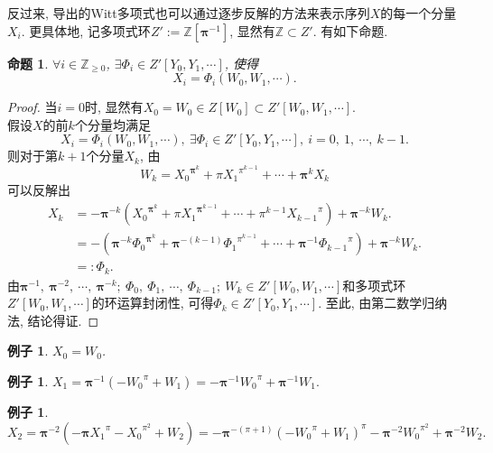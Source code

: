 \documentclass[UTF8, twoside]{ctexart}
\theoremstyle{nonumberplain}
\newtheorem{proof}{\heiti 证明}  %
\theoremstyle{nonumberplain}
\theoremstyle{plain}
\newtheorem{mingti}[dingyi]{命题}
\newtheorem{lizi}[dingyi]{例子}
\begin{document}
	反过来, 导出的Witt多项式也可以通过逐步反解的方法来表示序列$X$的每一个分量${{X}_{i}}$. 更具体地, 
	记多项式环$Z':=\mathbb{Z}\left[ {\bm{\pi}^{-1}} \right]$, 
	显然有$\mathbb{Z}\subset Z'$. 
	有如下命题.
	\begin{mingti} \label{202102231630}
		$\forall i\in {{\mathbb{Z}}_{\ge 0}}$, $\exists \Phi_{i} \in Z'\left[ {{Y}_{0}},{{Y}_{1}},\cdots  \right]$, 使得
		\[
			{{X}_{i}}=\Phi_{i} \left( {{W}_{0}},{{W}_{1}},\cdots  \right).
		\]
	\end{mingti}
	\begin{proof}
		当$i=0$时, 显然有${{X}_{0}}={{W}_{0}}\in Z\left[ {{W}_{0}} \right]\subset Z'\left[ {{W}_{0}},{{W}_{1}},\cdots  \right]$.\\
		假设$X$的前$k$个分量均满足
		\[
			{{X}_{i}}={{\Phi }_{i}}\left( {{W}_{0}},{{W}_{1}},\cdots  \right),
			\ \exists {{\Phi }_{i}}\in Z'\left[ {{Y}_{0}},{{Y}_{1}},\cdots  \right],
			\ i=0,\ 1,\ \cdots ,\ k-1.
		\]
		则对于第$k+1$个分量${{X}_{k}}$, 由
		\[
		{{W}_{k}}={{X}_{0}}^{{\bm{\pi }^{k}}}+\pi {{X}_{1}}^{{{\pi }^{k-1}}}+\cdots +{\bm{\pi }^{k}}{{X}_{k}}	
		\]
		可以反解出
		\begin{align*}
			{{X}_{k}}&=-{\bm{\pi }^{-k}}\left( {{X}_{0}}^{{\bm{\pi }^{k}}}+\pi {{X}_{1}}^{{\bm{\pi }^{k-1}}}+\cdots +{{\pi }^{k-1}}{{X}_{k-1}}^{\pi } \right)+{\bm{\pi }^{-k}}{{W}_{k}}. \\ 
			& =-\left( {\bm{\pi }^{-k}}{{\Phi }_{0}}^{{\bm{\pi }^{k}}}+{\bm{\pi }^{-\left( k-1 \right)}}{{\Phi }_{1}}^{{{\pi }^{k-1}}}+\cdots +{\bm{\pi }^{-1}}{{\Phi }_{k-1}}^{\pi } \right)+{\bm{\pi }^{-k}}{{W}_{k}}. \\ 
			& =:{{\Phi }_{k}}.
		\end{align*}
		由${\bm{\pi }^{-1}},\ {\bm{\pi }^{-2}},\ \cdots ,\ {\bm{\pi }^{-k}};\ {{\Phi }_{0}},\ {{\Phi }_{1}},\ \cdots ,\ {{\Phi }_{k-1}};\ {{W}_{k}}\in Z'\left[ {{W}_{0}},{{W}_{1}},\cdots  \right]$和多项式环$Z'\left[ {{W}_{0}},{{W}_{1}},\cdots  \right]$的环运算封闭性, 可得${{\Phi }_{k}}\in Z'\left[ {{Y}_{0}},{{Y}_{1}},\cdots  \right]$. 至此, 由第二数学归纳法, 结论得证. 
	\end{proof}
	\begin{lizi}
		${{X}_{0}}={{W}_{0}}$.
	\end{lizi}
	\begin{lizi}
		${{X}_{1}}={\bm{\pi }^{-1}}\left( -{{W}_{0}}^{\pi }+{{W}_{1}} \right)=-{\bm{\pi }^{-1}}{{W}_{0}}^{\pi }+{\bm{\pi }^{-1}}{{W}_{1}}.$
	\end{lizi}
	\begin{lizi}
	${{X}_{2}}={\bm{\pi }^{-2}}\left( -\bm{\pi} {{X}_{1}}^{\pi }-{{X}_{0}}^{{{\pi }^{2}}}+{{W}_{2}} \right)=-{\bm{\pi }^{-\left( \pi +1 \right)}}{{\left( -{{W}_{0}}^{\pi }+{{W}_{1}} \right)}^{\pi }}-{\bm{\pi }^{-2}}{{W}_{0}}^{{{\pi }^{2}}}+{\bm{\pi }^{-2}}{{W}_{2}}.$
	\end{lizi}
	\vskip 0.5cm
	
\end{document}
